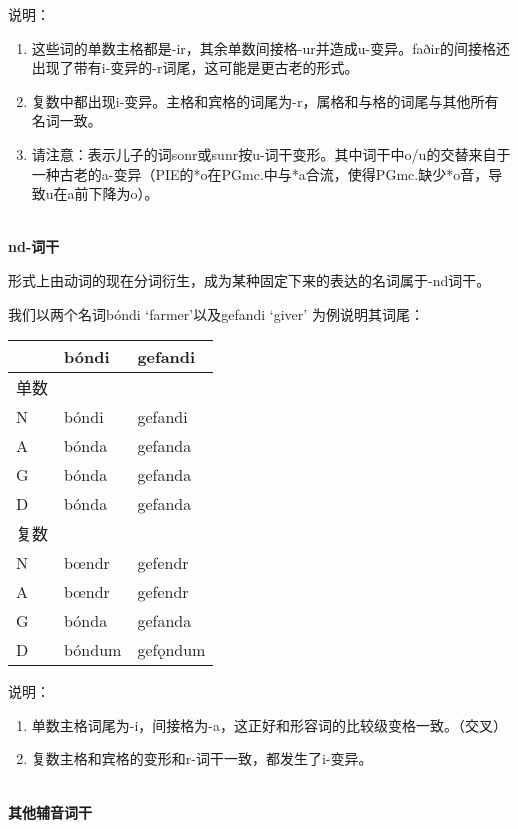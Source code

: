   说明：

  \begin{enumerate}[1)]
    \item
          这些词的单数主格都是-ir，其余单数间接格-ur并造成u-变异。faðir的间接格还出现了带有i-变异的-r词尾，这可能是更古老的形式。
    \item
          复数中都出现i-变异。主格和宾格的词尾为-r，属格和与格的词尾与其他所有名词一致。
    \item
          请注意：表示儿子的词sonr或sunr按u-词干变形。其中词干中o/u的交替来自于一种古老的a-变异（PIE的*o在PGmc.中与*a合流，使得PGmc.缺少*o音，导致u在a前下降为o）。
  \end{enumerate}

~\\
\textbf{nd-词干}

形式上由动词的现在分词衍生，成为某种固定下来的表达的名词属于-nd词干。

我们以两个名词bóndi `farmer'以及gefandi `giver' 为例说明其词尾：

\begin{longtable}{lll}
  \toprule
       & \textbf{bóndi}  & \textbf{gefandi}  \\
  \midrule
  \endhead
  \bottomrule
  \endfoot
  单数 &        &          \\
  N    & bóndi  & gefandi  \\
  A    & bónda  & gefanda  \\
  G    & bónda  & gefanda  \\
  D    & bónda  & gefanda  \\
  复数 &        &          \\
  N    & bœndr  & gefendr  \\
  A    & bœndr  & gefendr  \\
  G    & bónda  & gefanda  \\
  D    & bóndum & gefǫndum \\
\end{longtable}

说明：

\begin{enumerate}[1)]
  \item
        单数主格词尾为-i，间接格为-a，这正好和形容词的比较级变格一致。（交叉）
  \item
        复数主格和宾格的变形和r-词干一致，都发生了i-变异。
\end{enumerate}

~\\
\textbf{其他辅音词干}

